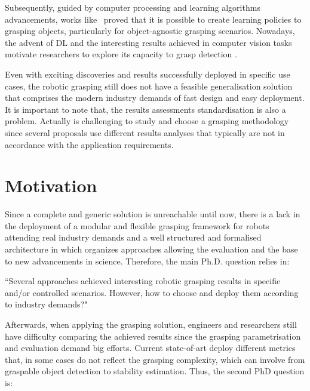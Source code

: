 Subsequently, guided by computer processing and learning algorithms advancements,  works like~\cite{Saxena2008} proved that it is possible to create learning policies to grasping objects, particularly for object-agnostic grasping scenarios. Nowadays, the advent of \ac{DL} and the interesting results achieved in computer vision tasks motivate researchers to explore its capacity to grasp detection \cite{Lenz2015,Redmon2015,Kumra2017,Watson2017,Chu2018,asif2018ensemblenet, Chen2020, Guo2017,Gariepy2019,Mousavian_2019_ICCV,Ghazaei2019,TenPas2017,Chen2019,
Mahler2016,Mahler2017b, Mahler2017d, Mahler2017,Mahler2019,song2020novel}. 

Even with exciting discoveries and results successfully deployed in specific use cases, the robotic grasping still does not have a feasible generalisation solution that comprises the modern industry demands of fast design and easy deployment. It is important to note that, the results assessments standardisation is also a problem. Actually is challenging to study and choose a grasping methodology since several proposals use different results analyses that typically are not in accordance with the application requirements. 


\section{Motivation}
\label{cap1:introduction:motiviation}




Since a complete and generic solution is unreachable until now, there is a lack in the deployment of a modular and flexible grasping framework for robots attending real industry demands and a well structured and formalised architecture in which organizes approaches allowing the evaluation and the base to new advancements in science. Therefore, the main Ph.D. question relies in:

\begin{flushright}
``Several approaches achieved interesting robotic grasping results in specific and/or controlled scenarios. However, how to choose and deploy them according to industry demands?"
\end{flushright}

Afterwards, when applying the grasping solution, engineers and researchers still have difficulty comparing the achieved results since the grasping parametrisation and evaluation demand big efforts. Current state-of-art deploy different metrics that, in some cases do not reflect the grasping complexity, which can involve from graspable object detection to stability estimation. Thus, the second PhD question is:


